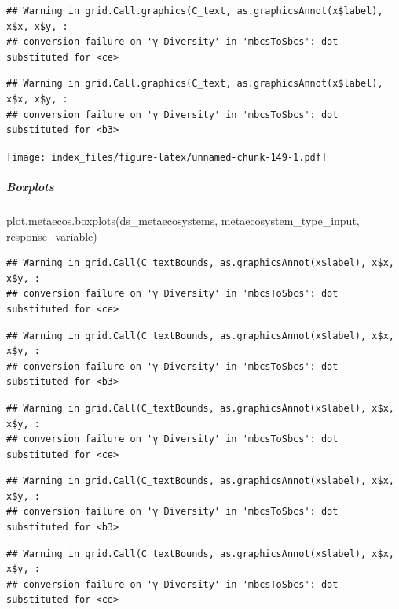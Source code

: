 \documentclass[
]{article}
\newenvironment{Shaded}{\begin{snugshade}}{\end{snugshade}}
\newcommand{\FunctionTok}[1]{\textcolor[rgb]{0.00,0.00,0.00}{#1}}
\newcommand{\NormalTok}[1]{#1}
\begin{document}
\begin{verbatim}
## Warning in grid.Call.graphics(C_text, as.graphicsAnnot(x$label), x$x, x$y, :
## conversion failure on 'γ Diversity' in 'mbcsToSbcs': dot substituted for <ce>
\end{verbatim}

\begin{verbatim}
## Warning in grid.Call.graphics(C_text, as.graphicsAnnot(x$label), x$x, x$y, :
## conversion failure on 'γ Diversity' in 'mbcsToSbcs': dot substituted for <b3>
\end{verbatim}

\texttt{[image: index\_files/figure-latex/unnamed-chunk-149-1.pdf]}

\hypertarget{boxplots-3}{%
\subparagraph{Boxplots}\label{boxplots-3}}

\begin{Shaded}
\begin{Highlighting}[]
\FunctionTok{plot.metaecos.boxplots}\NormalTok{(ds\_metaecosystems, metaecosystem\_type\_input,}
\NormalTok{                       response\_variable)}
\end{Highlighting}
\end{Shaded}

\begin{verbatim}
## Warning in grid.Call(C_textBounds, as.graphicsAnnot(x$label), x$x, x$y, :
## conversion failure on 'γ Diversity' in 'mbcsToSbcs': dot substituted for <ce>
\end{verbatim}

\begin{verbatim}
## Warning in grid.Call(C_textBounds, as.graphicsAnnot(x$label), x$x, x$y, :
## conversion failure on 'γ Diversity' in 'mbcsToSbcs': dot substituted for <b3>
\end{verbatim}

\begin{verbatim}
## Warning in grid.Call(C_textBounds, as.graphicsAnnot(x$label), x$x, x$y, :
## conversion failure on 'γ Diversity' in 'mbcsToSbcs': dot substituted for <ce>
\end{verbatim}

\begin{verbatim}
## Warning in grid.Call(C_textBounds, as.graphicsAnnot(x$label), x$x, x$y, :
## conversion failure on 'γ Diversity' in 'mbcsToSbcs': dot substituted for <b3>
\end{verbatim}

\begin{verbatim}
## Warning in grid.Call(C_textBounds, as.graphicsAnnot(x$label), x$x, x$y, :
## conversion failure on 'γ Diversity' in 'mbcsToSbcs': dot substituted for <ce>
\end{verbatim}
\end{document}
